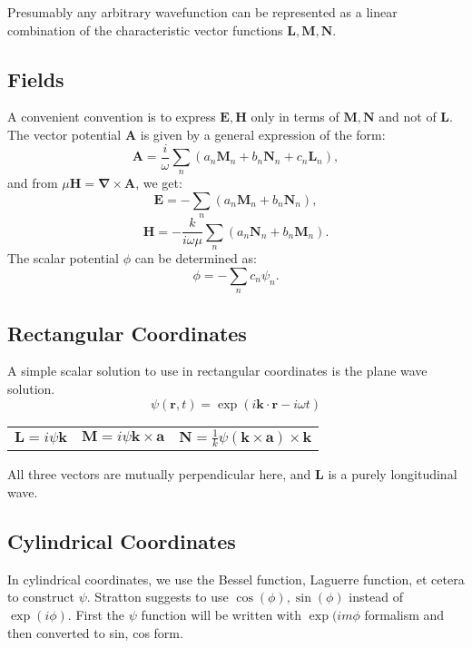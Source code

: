 \documentclass[11pt,letterpaper]{article}
\newcommand{\del}{\boldsymbol\nabla}
\begin{document}
Presumably any arbitrary wavefunction can be represented as a linear combination of the characteristic vector functions $\mathbf{L}, \mathbf{M}, \mathbf{N}$. 

\subsection{Fields}
A convenient convention is to express $\mathbf{E}, \mathbf{H}$ only in terms of $\mathbf{M},\mathbf{N}$ and not of $\mathbf{L}$. The vector potential $\mathbf{A}$ is given by a general expression of the form:
\begin{equation}
\mathbf{A} = \frac{i}{\omega}\sum\limits_{n} (a_n \mathbf{M}_n + b_n \mathbf{N}_n + c_n \mathbf{L}_n ),
\end{equation}
and from $\mu \mathbf{H} = \del \times \mathbf{A}$, we get: 
\begin{equation}
\mathbf{E}=-\sum\limits_n (a_n \mathbf{M}_n + b_n \mathbf{N}_n),
\end{equation}
\begin{equation}
\mathbf{H}=-\frac{k}{i\omega\mu}\sum\limits_n (a_n \mathbf{N}_n + b_n \mathbf{M}_n).
\end{equation}
The scalar potential $\phi$ can be determined as:
\begin{equation}
\phi = - \sum\limits_n c_n \psi_n.
\end{equation}

\subsection{Rectangular Coordinates}
A simple scalar solution to use in rectangular coordinates is the plane wave solution. 
\begin{equation}
\psi(\mathbf{r},t) = \exp(i \mathbf{k}\cdot\mathbf{r}-i\omega t)
\end{equation}

\begin{center}
\begin{tabular}{lll}
$\mathbf{L}= i \psi \mathbf{k}$ & $\mathbf{M}=i \psi \mathbf{k}\times\mathbf{a}$ & $\mathbf{N}= \frac{1}{k}\psi (\mathbf{k}\times\mathbf{a})\times\mathbf{k}$\\
\end{tabular}
\end{center}
All three vectors are mutually perpendicular here, and $\mathbf{L}$ is a purely longitudinal wave. 

\subsection{Cylindrical Coordinates}
In cylindrical coordinates, we use the Bessel function, Laguerre function, et cetera to construct $\psi$. 
Stratton suggests to use $\cos(\phi), \sin(\phi)$ instead of $\exp(i\phi)$. First the $\psi$ function will be written with $\exp(im\phi$ formalism and then converted to sin, cos form. 
\end{document}
